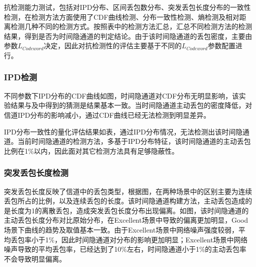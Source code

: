抗检测能力测试，包括对IPD分布、区间丢包数分布、突发丢包长度分布的一致性检测，在检测方法方面使用了CDF曲线检测、分布一致性检测、熵检测及相对距离检测几种不同的检测方式。按照表中的检测方法汇总，汇总不同检测方法的检测结果，得到是否为时间隐通道的判定结论。由于该时间隐通道的丢包密度，主要由参数$L_{Codeword}$决定，因此对抗检测性的评估主要基于不同的$L_{Codeword}$参数配置进行。

\subsubsection{IPD检测}
\label{chap:hash:result:undetectability:ipd}

不同参数下IPD分布的CDF曲线如图，时间隐通道对CDF分布无明显影响，该实验结果与及中得到的猜测是结果基本一致。当时间隐通道主动丢包的密度降低，对信道IPD分布的影响减小，通过CDF曲线已经无法检测到明显差异。


IPD分布一致性的量化评估结果如表，通过IPD分布情况，无法检测出该时间隐通道。当前时间隐通道的检测方法，多基于IPD分布特征，该时间隐通道的主动丢包比例在1\%以内，因此面对其它检测方法具有足够隐蔽性。

\subsubsection{突发丢包长度检测}
\label{chap:hash:result:undetectability:burst}

突发丢包长度反映了信道中的丢包类型，根据图，在两种场景中的区别主要为连续丢包所占的比例，以及连续丢包的长度。该时间隐通道构建方法，主动丢包造成的是长度为1的离散丢包，造成突发丢包长度分布出现偏离。如图，该时间隐通道的主动丢包长度分布对比原始分布，在Excellent场景中导致的偏离更加明显，Good场景下曲线的趋势及取值基本一致。由于Excellent场景中网络噪声强度较弱，平均丢包率小于1\%，因此时间隐通道对分布的影响更加明显；Excellent场景中网络噪声导致的平均丢包率，已经达到了10\%左右，时间隐通道小于1\%的主动丢包率不会导致明显偏离。

